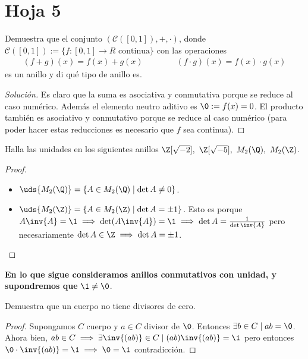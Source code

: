 \section{Hoja 5}

\begin{ex}[H5.1]
	Demuestra que el conjunto $(\mathcal{C}([0, 1]), +, ·)$, donde $\mathcal{C}([0, 1]) := \{f : [0, 1] \to R \text{ continua}\}$ con las operaciones
	\begin{align*}
		(f+g)(x) = f(x)+g(x)\qquad\qquad (f\cdot g)(x) = f(x)\cdot g(x)
	\end{align*}
	es un anillo y di qué tipo de anillo es.
\end{ex}

\begin{proof}[Solución]
	Es claro que la suma es asociativa y conmutativa porque se reduce al caso numérico. Además el elemento neutro aditivo es $\0 := f(x) = 0$. El producto también es asociativo y conmutativo porque se reduce al caso numérico (para poder hacer estas reducciones es necesario que $f$ sea continua).
\end{proof}

\begin{ex}[H5.2]
	Halla las unidades en los siguientes anillos $\Z[\sqrt{-2}],\ \Z[\sqrt{-5}],\ M_2(\Q),\ M_2(\Z)$.
\end{ex}

\begin{proof}
	\begin{itemize}
		\item $\uds{M_2(\Q)} = \{A \in M_2(\Q) \mid \det A \neq 0\}$.
		\item $\uds{M_2(\Z)} = \{A \in M_2(\Z) \mid \det A = \pm 1\}$. Esto es porque $A\inv{A} = \1 \implies \det(A\inv{A}) = \1 \implies \det A = \frac{1}{\det \inv{A}}$ pero necesariamente $\det A \in \Z \implies \det A = \pm 1$.
	\end{itemize}
\end{proof}

\textbf{En lo que sigue consideramos anillos conmutativos con unidad, y supondremos que} $\1 \neq \0$.

\begin{ex}[H5.3]
	Demuestra que un cuerpo no tiene divisores de cero.
\end{ex}

\begin{proof}
	Supongamos $C$ cuerpo y $a \in C$ divisor de $\0$. Entonces $\exists b \in C \mid ab = \0$. Ahora bien, $ab \in C \implies \exists \inv{(ab)} \in C \mid (ab)\inv{(ab)} = \1$ pero entonces $\0\cdot \inv{(ab)} = \1 \implies \0 = \1$ contradicción.
\end{proof}

